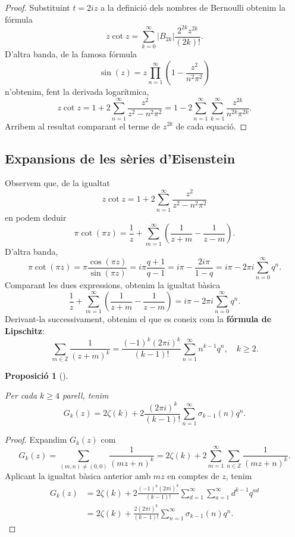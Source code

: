 \documentclass[
  letterpaper,
  DIV=11,
  numbers=noendperiod]{scrreprt}
\theoremstyle{plain}
\theoremstyle{plain}
\theoremstyle{definition}
\theoremstyle{plain}
\newtheorem{proposition}{Proposició}[chapter]
\theoremstyle{plain}
\theoremstyle{definition}
\theoremstyle{remark}
\begin{document}
\begin{proof}
Substituint \(t=2iz\) a la definició dels nombres de Bernoulli obtenim
la fórmula \[
z\cot z = \sum_{k=0}^\infty |B_{2k}|\frac{2^{2k}z^{2k}}{(2k)!}.
\] D'altra banda, de la famosa fórmula \[
\sin(z) = z\prod_{n=1}^\infty \left(1-\frac{z^2}{n^2\pi^2}\right)
\] n'obtenim, fent la derivada logarítmica, \[
z\cot z = 1+2\sum_{n=1}^\infty \frac{z^2}{z^2-n^2\pi^2}=1-2\sum_{n=1}^\infty\sum_{k=1}^\infty \frac{z^{2k}}{n^{2k}{\pi^{2k}}}.
\] Arribem al resultat comparant el terme de \(z^{2k}\) de cada equació.
\end{proof}

\subsection{Expansions de les sèries
d'Eisenstein}\label{expansions-de-les-suxe8ries-deisenstein}

Observem que, de la igualtat \[
z\cot z = 1+2\sum_{n=1}^\infty \frac{z^2}{z^2-n^2\pi^2}
\] en podem deduir \[
\pi\cot (\pi z)=\frac{1}{z} + \sum_{m=1}^\infty \left(\frac{1}{z+m}-\frac{1}{z-m}\right).
\] D'altra banda, \[
\pi\cot(\pi z) = \pi \frac{\cos(\pi z)}{\sin(\pi z)} = i\pi\frac{q+1}{q-1} = i\pi - \frac{2i\pi}{1-q} = i\pi -2\pi i \sum_{n=0}^\infty q^n.
\] Comparant les dues expressions, obtenim la igualtat bàsica \[
\frac{1}{z} + \sum_{m=1}^\infty \left(\frac{1}{z+m}-\frac{1}{z-m}\right) =  i\pi -2\pi i \sum_{n=0}^\infty q^n.
\] Derivant-la successivament, obtenim el que es coneix com la
\textbf{fórmula de Lipschitz}: \[
\sum_{m\in\mathbb{Z}} \frac{1}{(z+m)^k} = \frac{(-1)^k (2\pi i)^k}{(k-1)!}\sum_{n=1}^\infty n^{k-1}q^n, \quad k\geq 2.
\]

\begin{proposition}[]\protect\hypertarget{prp-}{}\label{prp-}

Per cada \(k\geq 4\) parell, tenim \[
G_k(z) = 2\zeta(k) + 2\frac{(2\pi i)^{k}}{(k-1)!} \sum_{n=1}^\infty \sigma_{k-1}(n)q^n.
\]

\end{proposition}

\begin{proof}
Expandim \(G_k(z)\) com \[
G_k(z)=\sum_{(m,n)\neq (0,0)} \frac{1}{(mz+n)^k} =2\zeta(k) + 2\sum_{m=1}^\infty\sum_{n\in\mathbb{Z}} \frac{1}{(mz+n)^k}.
\] Aplicant la igualtat bàsica anterior amb \(mz\) en comptes de \(z\),
tenim \begin{align*}
G_k(z) &= 2\zeta(k) +2\frac{(-1)^k (2\pi i)^k}{(k-1)!} \sum_{d=1}^\infty \sum_{a=1}^\infty d^{k-1} q^{ad}\\
&= 2\zeta(k) + \frac{2(2\pi i)^k}{(k-1)!}\sum_{n=1}^\infty \sigma_{k-1}(n)q^n.
\end{align*}
\end{proof}
\end{document}
